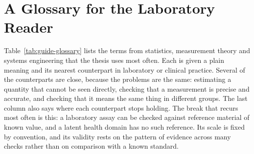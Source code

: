 \section*{A Glossary for the Laboratory Reader}
\label{sec:guide-glossary}

Table~\ref{tab:guide-glossary} lists the terms from statistics, measurement
theory and systems engineering that the thesis uses most often. Each is given
a plain meaning and its nearest counterpart in laboratory or clinical
practice. Several of the counterparts are close, because the problems are the
same: estimating a quantity that cannot be seen directly, checking that a
measurement is precise and accurate, and checking that it means the same thing
in different groups. The last column also says where each counterpart stops
holding. The break that recurs most often is this: a laboratory assay
can be checked against reference material of known value, and a latent health
domain has no such reference. Its scale is fixed by convention, and its
validity rests on the pattern of evidence across many checks rather than on
comparison with a known standard.

